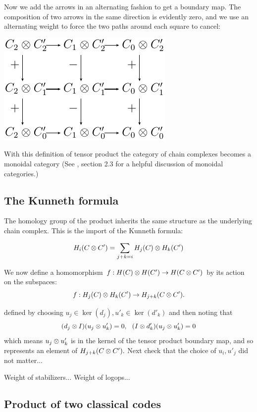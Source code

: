 Now we add the arrows in an alternating fashion to get a boundary map.
The composition of two arrows in the same direction is
evidently zero, and
we use an alternating weight 
to force the two paths around each square to cancel:

\begin{center}
\includegraphics{figure_05.pdf}
\end{center}

With this definition of tensor product the category of
chain complexes becomes a monoidal category 
(See \cite{Baez09}, section 2.3 for a helpful discussion of
monoidal categories.)

\subsection{The Kunneth formula}

The homology group of the product inherits the same structure
as the underlying chain complex.
This is the import of the Kunneth formula:

    $$ H_i(C\otimes C') = \sum_{j+k=i} H_j(C) \otimes H_k(C') $$

We now define a homomorphism
$ f:H(C)\otimes H(C') \to H(C\otimes C')$
by its action on the subspaces: 
    $$ f:H_j(C)\otimes H_k(C') \to H_{j+k}(C\otimes C').$$

defined by choosing $u_j\in \ker(d_j), u'_k\in \ker(d'_k)$
and then noting that 
    $$ (d_j\otimes I)(u_j\tensor u'_k) = 0,\ \ 
        (I\otimes d'_k)(u_j\tensor u'_k) = 0 $$
which means $u_j\otimes u'_k$ is in the kernel
of the tensor product boundary map, and so represents
an element of $H_{j+k}(C\otimes C').$
Next check that the choice of $u_i, u'_j$ did not matter...

Weight of stabilizers...
Weight of logops...


\subsection{Product of two classical codes}


